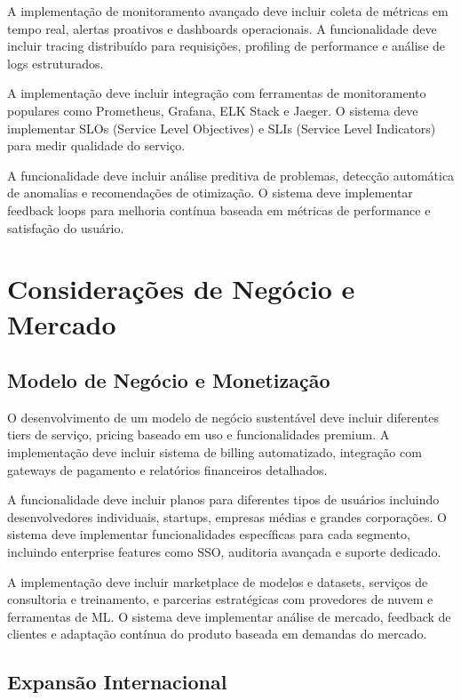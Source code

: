 \documentclass[12pt,a4paper]{article}
\begin{document}
A implementação de monitoramento avançado deve incluir coleta de métricas em tempo real, alertas proativos e dashboards operacionais. A funcionalidade deve incluir tracing distribuído para requisições, profiling de performance e análise de logs estruturados.

A implementação deve incluir integração com ferramentas de monitoramento populares como Prometheus, Grafana, ELK Stack e Jaeger. O sistema deve implementar SLOs (Service Level Objectives) e SLIs (Service Level Indicators) para medir qualidade do serviço.

A funcionalidade deve incluir análise preditiva de problemas, detecção automática de anomalias e recomendações de otimização. O sistema deve implementar feedback loops para melhoria contínua baseada em métricas de performance e satisfação do usuário.

\section{Considerações de Negócio e Mercado}

\subsection{Modelo de Negócio e Monetização}

O desenvolvimento de um modelo de negócio sustentável deve incluir diferentes tiers de serviço, pricing baseado em uso e funcionalidades premium. A implementação deve incluir sistema de billing automatizado, integração com gateways de pagamento e relatórios financeiros detalhados.

A funcionalidade deve incluir planos para diferentes tipos de usuários incluindo desenvolvedores individuais, startups, empresas médias e grandes corporações. O sistema deve implementar funcionalidades específicas para cada segmento, incluindo enterprise features como SSO, auditoria avançada e suporte dedicado.

A implementação deve incluir marketplace de modelos e datasets, serviços de consultoria e treinamento, e parcerias estratégicas com provedores de nuvem e ferramentas de ML. O sistema deve implementar análise de mercado, feedback de clientes e adaptação contínua do produto baseada em demandas do mercado.

\subsection{Expansão Internacional}
\end{document}
